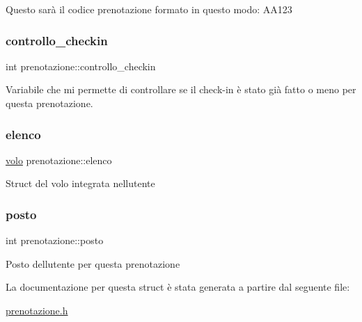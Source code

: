 Questo sarà il codice prenotazione formato in questo modo\+: A\+A123 \mbox{\label{structprenotazione_ad9b217a854eb164b54bca2c7cbb826bc}} 
\subsubsection{\texorpdfstring{controllo\+\_\+checkin}{controllo\_checkin}}
{\footnotesize\ttfamily int prenotazione\+::controllo\+\_\+checkin}

Variabile che mi permette di controllare se il check-\/in è stato già fatto o meno per questa prenotazione. \mbox{\label{structprenotazione_a990364d239fee56058bc07e82db99a69}} 
\subsubsection{\texorpdfstring{elenco}{elenco}}
{\footnotesize\ttfamily \hyperlink{structvolo}{volo} prenotazione\+::elenco}

Struct del volo integrata nell\textquotesingle{}utente \mbox{\label{structprenotazione_a3a5dfed8c5d28b4e09d0757a24ae6f04}} 
\subsubsection{\texorpdfstring{posto}{posto}}
{\footnotesize\ttfamily int prenotazione\+::posto}

Posto dell\textquotesingle{}utente per questa prenotazione 

La documentazione per questa struct è stata generata a partire dal seguente file\+:\begin{DoxyCompactItemize}
\item 
\hyperlink{prenotazione_8h}{prenotazione.\+h}\end{DoxyCompactItemize}
